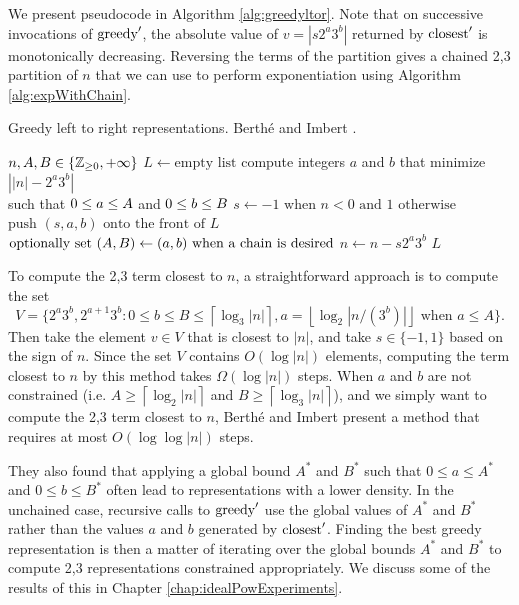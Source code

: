 \documentclass{ucalgthes1}
\theoremstyle{definition}
\newcommand{\ZZgez}{\mathbb{Z}_{\ge 0}}
\newcommand{\floor}[1]{\left\lfloor #1 \right\rfloor}
\newcommand{\ceil}[1]{\left\lceil #1 \right\rceil}
\begin{document}
\noindent
We present pseudocode in Algorithm \ref{alg:greedyltor}. Note that on successive invocations of $\textrm{greedy}'$, the absolute value of $v=|s2^a3^b|$ returned by $\textrm{closest}'$ is monotonically decreasing.  Reversing the terms of the partition gives a chained 2,3 partition of $n$ that we can use to perform exponentiation using Algorithm \ref{alg:expWithChain}.

\begin{algorithm}[h]
\caption{Greedy left to right representations. Berth{\'e} and Imbert \cite{Berthe2009}.}
\label{alg:greedyltor}
\begin{algorithmic}[1]
\REQUIRE $n, \amax, \bmax \in \{\ZZgez, +\infty\}$ 
\STATE $L \gets \textrm{empty list}$
	\STATE compute integers $a$ and $b$ that minimize $\left||n| - 2^a3^b \right|$ \\
	       such that $0 \le a \le A$ and $0 \le b \le B$
	\STATE $s \gets -1 \textrm{ when } n < 0 \textrm{ and } 1 \textrm{ otherwise}$
	\STATE $\textrm{push }(s, a, b) \textrm{ onto the front of } L$
	\STATE $\textrm{optionally set } (A, B) \gets (a, b) \textrm{ when a chain is desired}$
	\STATE $n \gets n - s2^a3^b$
\ENDWHILE
\RETURN $L$
\end{algorithmic}
\end{algorithm}

To compute the 2,3 term closest to $n$, a straightforward approach is to compute the set 
\[
V = \{2^a3^b, 2^{a+1}3^b : 0 \le b \le B \le \ceil{\log_3|n|}, a=\floor{\log_2|n/(3^b)|} \textrm{ when } a \le A\}.
\]
Then take the element $v \in V$ that is closest to $|n|$, and take $s \in \{-1, 1\}$ based on the sign of $n$. Since the set $V$ contains $O(\log |n|)$ elements, computing the term closest to $n$ by this method takes $\Omega(\log |n|)$ steps.  When $a$ and $b$ are not constrained (i.e. $A \ge \ceil{\log_2|n|}$ and $B \ge \ceil{\log_3|n|}$), and we simply want to compute the 2,3 term closest to $n$, Berth\'{e} and Imbert \cite{Berthe2009} present a method that requires at most $O(\log \log |n|)$ steps. 

They also found that applying a global bound $A^*$ and $B^*$ such that $0 \le a \le A^*$ and $0 \le b \le B^*$ often lead to representations with a lower density.  In the unchained case, recursive calls to $\textrm{greedy}'$ use the global values of $A^*$ and $B^*$ rather than the values $a$ and $b$ generated by $\textrm{closest}'$.  Finding the best greedy representation is then a matter of iterating over the global bounds $A^*$ and $B^*$ to compute 2,3 representations constrained appropriately.  We discuss some of the results of this in Chapter \ref{chap:idealPowExperiments}.
\end{document}
